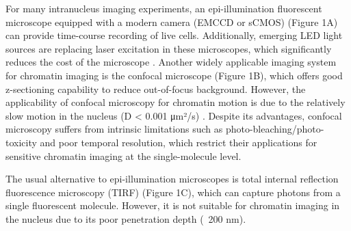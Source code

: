 For many intranucleus imaging experiments, an epi-illumination fluorescent microscope equipped with a modern camera (EMCCD or sCMOS) (Figure 1A) can provide time-course recording of live cells. Additionally, emerging LED light sources are replacing laser excitation in these microscopes, which significantly reduces the cost of the microscope \parencite{Albeanu2008,Hattori2009,Zheng2013}. Another widely applicable imaging system for chromatin imaging is the confocal microscope (Figure 1B), which offers good z-sectioning capability to reduce out-of-focus background. However, the applicability of confocal microscopy for chromatin motion is due to the relatively slow motion in the nucleus (D < 0.001 μm²/s) \parencite{Shukron2019}. Despite its advantages, confocal microscopy suffers from intrinsic limitations such as photo-bleaching/photo-toxicity and poor temporal resolution, which restrict their applications for sensitive chromatin imaging at the single-molecule level.

The usual alternative to epi-illumination microscopes is total internal reflection fluorescence microscopy (TIRF) (Figure 1C), which can capture photons from a single fluorescent molecule. However, it is not suitable for chromatin imaging in the nucleus due to its poor penetration depth (~200 nm).

